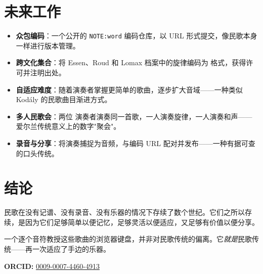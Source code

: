 \documentclass[11pt]{article}
\begin{document}
\section{未来工作}

\begin{card}
\begin{itemize}
  \item \textbf{众包编码}：一个公开的 \texttt{NOTE:word} 编码仓库，以 URL 形式提交，像民歌本身一样进行版本管理。
  \item \textbf{跨文化集合}：将 Essen、Roud 和 Lomax 档案中的旋律编码为 \np{} 格式，获得许可并注明出处。
  \item \textbf{自适应难度}：随着演奏者掌握更简单的歌曲，逐步扩大音域——一种类似 Kod\'aly 的民歌曲目渐进方式。
  \item \textbf{多人民歌会}：两位 \np{} 演奏者演奏同一首歌，一人演奏旋律，一人演奏和声——爱尔兰传统意义上的数字"聚会"。
  \item \textbf{录音与分享}：将演奏捕捉为音频，与编码 URL 配对并发布——一种有据可查的口头传统。
\end{itemize}
\end{card}

\section{结论}

民歌在没有记谱、没有录音、没有乐器的情况下存续了数个世纪。它们之所以存续，是因为它们足够简单以便记忆，足够灵活以便适应，又足够有价值以便分享。

一个逐个音符教授这些歌曲的浏览器键盘，并非对民歌传统的偏离。它\emph{就是}民歌传统——再一次适应了手边的乐器。

\vspace{0.5em}
\noindent\textbf{ORCID:} \href{https://orcid.org/0009-0007-4460-4913}{0009-0007-4460-4913}



\end{document}
